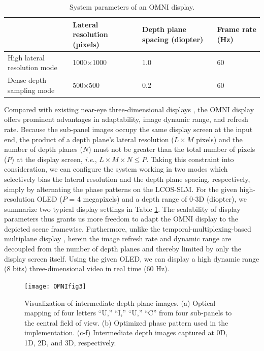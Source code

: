 \documentclass[9pt,twocolumn,twoside]{osajnl}
\begin{document}
\begin{table}[htbp]
	\centering
	\caption{System parameters of an OMNI display.}
	\label{table:2}
	\begin{tabular}{p{2.5cm}p{1.5cm}p{2cm}p{1cm}}
		\hline
		&Lateral resolution (pixels)&Depth plane spacing (diopter)&Frame rate (Hz)\\
		\hline
		High lateral resolution mode&1000$\times$1000&1.0&60\\
		Dense depth sampling mode&500$\times$500&0.2&60\\
		\hline
	\end{tabular}
\end{table}
Compared with existing near-eye three-dimensional displays \cite{hu2014high,hu2014design,hua20143d,grzegorzek2013time,llull2015design,reichow2014three}, the OMNI display offers prominent advantages in adaptability, image dynamic range, and refresh rate. Because the sub-panel images occupy the same display screen at the input end, the product of a depth plane’s lateral resolution ($L\times M$ pixels) and the number of depth planes ($N$) must not be greater than the total number of pixels ($P$) at the display screen, \emph{i.e.}, $L\times M\times N\leq P$. Taking this constraint into consideration, we can configure the system working in two modes which selectively bias the lateral resolution and the depth plane spacing, respectively, simply by alternating the phase patterns on the LCOS-SLM. For the given high-resolution OLED ($P$ = 4 megapixels) and a depth range of 0-3D (diopter), we summarize two typical display settings in Table \ref{table:2}. The scalability of display parameters thus grants us more freedom to adapt the OMNI display to the depicted scene framewise. Furthermore, unlike the temporal-multiplexing-based multiplane display \cite{hu2014design}, herein the image refresh rate and dynamic range are decoupled from the number of depth planes and thereby limited by only the display screen itself. Using the given OLED, we can display a high dynamic range (8 bits) three-dimensional video in real time (60 Hz).\par
\begin{figure}[htbp]
	\centering
	\texttt{[image: OMNIfig3]}
	\caption{Visualization of intermediate depth plane images. (a) Optical mapping of four letters “U,” “I,” “U,” “C” from four sub-panels to the central field of view. (b) Optimized phase pattern used in the implementation. (c-f) Intermediate depth images captured at 0D, 1D, 2D, and 3D, respectively.}
	\label{fig:3}
\end{figure}
\end{document}
